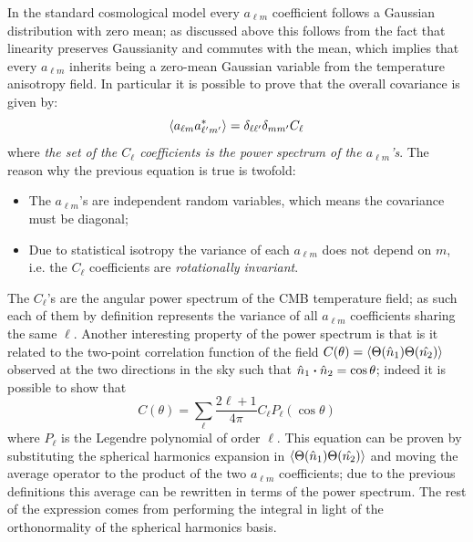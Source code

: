 In the standard cosmological model every $a_{\ell m}$ coefficient follows a Gaussian distribution with zero mean; as discussed above this follows from the fact that linearity preserves Gaussianity and commutes with the mean, which implies that every $a_{\ell m}$ inherits being a zero-mean Gaussian variable from the temperature anisotropy field.
In particular it is possible to prove that the overall covariance is given by:
\begin{equation}
\label{eq:angular_power_spectrum}
    \expval{a_{\ell m} a^*_{\ell' m'}} = \delta_{\ell \ell'} \delta_{m m'}C_\ell
\end{equation}
where \emph{the set of the $C_\ell$ coefficients is the power spectrum of the $a_{\ell m}$'s}. The reason why the previous equation is true is twofold:
\begin{itemize}
    \item The $a_{\ell m}$'s are independent random variables, which means the covariance must be diagonal;
    \item Due to statistical isotropy the variance of each $a_{\ell m}$ does not depend on $m$, i.e. the $C_\ell$ coefficients are \emph{rotationally invariant}.
\end{itemize}
The $C_\ell$'s are the angular power spectrum of the CMB temperature field; as such each of them by definition represents the variance of all $a_{\ell m}$ coefficients sharing the same $\ell$.
Another interesting property of the power spectrum is that is it related to the two-point correlation function of the field $C(\theta) = \expval{\Theta(\hat{n}_1) \Theta(\hat{n_2})}$ observed at the two directions in the sky such that $\hat{n}_1\vdot\hat{n}_2 = \cos\theta$; indeed it is possible to show that
\begin{equation*}
    C(\theta) = \sum_\ell \frac{2\ell+1}{4\pi}C_\ell P_\ell(\cos\theta)
\end{equation*}
where $P_\ell$ is the Legendre polynomial of order $\ell$. \cite{likelihood_cmb} 
This equation can be proven by substituting the spherical harmonics expansion in $\expval{\Theta(\hat{n}_1) \Theta(\hat{n_2})}$ and moving the average operator to the product of the two $a_{\ell m}$ coefficients; due to the previous definitions this average can be rewritten in terms of the power spectrum. The rest of the expression comes from performing the integral in light of the orthonormality of the spherical harmonics basis.


